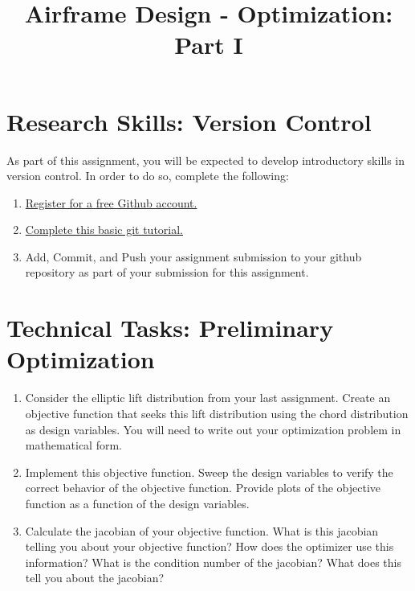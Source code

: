 \documentclass[11pt]{article}
\title{Airframe Design - Optimization: Part I}
\date{}
\begin{document}
	
\maketitle
\vspace{-3.0cm}

\section{Research Skills: Version Control}

As part of this assignment, you will be expected to develop introductory skills in version control.
In order to do so, complete the following:
\begin{enumerate}[label=\alph*.]
	\item \href{https://github.com/}{Register for a free Github account.}
	\item  \href{https://docs.github.com/en/get-started/quickstart/hello-world}{Complete this basic git tutorial.}
	\item Add, Commit, and Push your assignment submission to your github repository as part of your submission for this assignment.
\end{enumerate}
	
	
	
	

\section{Technical Tasks: Preliminary Optimization}

\begin{enumerate}[label=\alph*.]
    \item Consider the elliptic lift distribution from your last assignment. Create an objective function that seeks this lift distribution using the chord distribution as design variables. You will need to write out your optimization problem in mathematical form. 
    \item Implement this objective function. Sweep the design variables to verify the correct behavior of the objective function. Provide plots of the objective function as a function of the design variables.
    \item Calculate the jacobian of your objective function. What is this jacobian telling you about your objective function? How does the optimizer use this information? What is the condition number of the jacobian? What does this tell you about the jacobian?
\end{enumerate}
	
\end{document}
